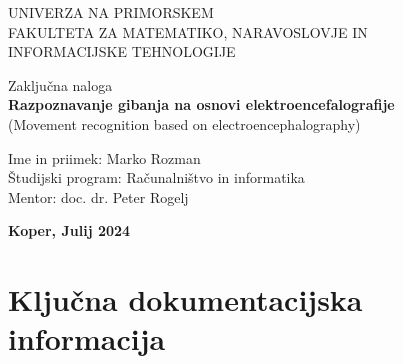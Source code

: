 \documentclass[12pt,a4paper,titlepage,openany]{report}
\begin{document}
\pagestyle{empty}
\begin{center}
\noindent \large UNIVERZA NA PRIMORSKEM\\
\large FAKULTETA ZA MATEMATIKO, NARAVOSLOVJE IN\\
INFORMACIJSKE TEHNOLOGIJE


\normalsize
\vspace{6cm}
Zaključna naloga\\
\textbf{\large Razpoznavanje gibanja na osnovi elektroencefalografije}\\
\normalsize
(Movement recognition based on electroencephalography)\\
\end{center}

\begin{flushleft}
\vspace{5cm}
\noindent Ime in priimek: Marko Rozman
\\
\noindent Študijski program: Računalništvo in informatika
\\
\noindent Mentor: doc. dr. Peter Rogelj 

\end{flushleft}

\vspace{4cm}
\begin{center}
\large \textbf{Koper, Julij 2024}
\end{center}
\newpage

\pagestyle{fancy}

\section*{Ključna dokumentacijska informacija}
\end{document}
